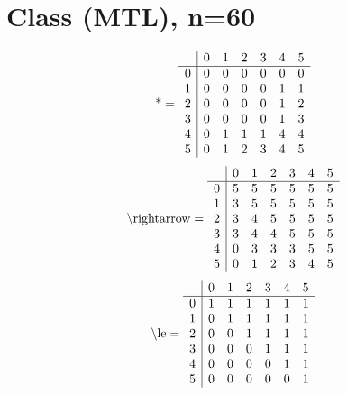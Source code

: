 \documentclass[11pt]{article}
\begin{document}
\section{Class (MTL), n=60}
\[\text{*} = 
\begin{array}{r | r r r r r r}
 & 0 & 1 & 2 & 3 & 4 & 5 \\ \hline
0 & 0 & 0 & 0 & 0 & 0 & 0 \\
1 & 0 & 0 & 0 & 0 & 1 & 1 \\
2 & 0 & 0 & 0 & 0 & 1 & 2 \\
3 & 0 & 0 & 0 & 0 & 1 & 3 \\
4 & 0 & 1 & 1 & 1 & 4 & 4 \\
5 & 0 & 1 & 2 & 3 & 4 & 5 \\
\end{array}
\]
\[\text{\textbackslash rightarrow} = 
\begin{array}{r | r r r r r r}
 & 0 & 1 & 2 & 3 & 4 & 5 \\ \hline
0 & 5 & 5 & 5 & 5 & 5 & 5 \\
1 & 3 & 5 & 5 & 5 & 5 & 5 \\
2 & 3 & 4 & 5 & 5 & 5 & 5 \\
3 & 3 & 4 & 4 & 5 & 5 & 5 \\
4 & 0 & 3 & 3 & 3 & 5 & 5 \\
5 & 0 & 1 & 2 & 3 & 4 & 5 \\
\end{array}
\]
\[\text{\textbackslash le} = 
\begin{array}{r | r r r r r r}
 & 0 & 1 & 2 & 3 & 4 & 5 \\ \hline
0 & 1 & 1 & 1 & 1 & 1 & 1 \\
1 & 0 & 1 & 1 & 1 & 1 & 1 \\
2 & 0 & 0 & 1 & 1 & 1 & 1 \\
3 & 0 & 0 & 0 & 1 & 1 & 1 \\
4 & 0 & 0 & 0 & 0 & 1 & 1 \\
5 & 0 & 0 & 0 & 0 & 0 & 1 \\
\end{array}
\]
\end{document}
